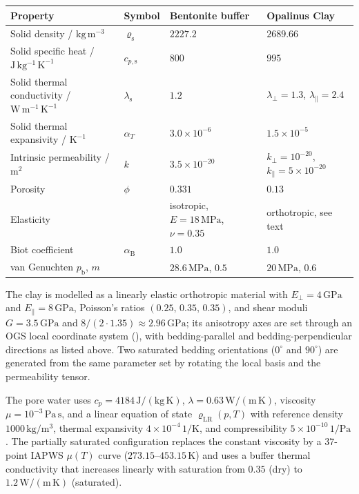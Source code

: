 \documentclass[11pt,a4paper]{tubaf-report}
\newcommand{\MPa}{\,\mathrm{MPa}}
\newcommand{\GPa}{\,\mathrm{GPa}}
\begin{document}
\begin{center}
\footnotesize
\begin{tabular}{@{}llll@{}}
\toprule
Property & Symbol & Bentonite buffer & Opalinus Clay \\
\midrule
Solid density / $\mathrm{kg\,m^{-3}}$ & $\varrho_{\mathrm s}$ & $2227.2$ & $2689.66$ \\
Solid specific heat / $\mathrm{J\,kg^{-1}\,K^{-1}}$ & $c_{p,\mathrm s}$ & $800$ & $995$ \\
Solid thermal conductivity / $\mathrm{W\,m^{-1}\,K^{-1}}$ & $\lambda_{\mathrm s}$ & $1.2$ &
  $\lambda_\perp=1.3$, $\lambda_\parallel=2.4$ \\
Solid thermal expansivity / $\mathrm{K^{-1}}$ & $\alpha_{T}$ & $3.0\times10^{-6}$ & $1.5\times10^{-5}$ \\
Intrinsic permeability / $\mathrm{m^2}$ & $k$ & $3.5\times10^{-20}$ &
  $k_\perp=10^{-20}$, $k_\parallel=5\times10^{-20}$ \\
Porosity & $\phi$ & $0.331$ & $0.13$ \\
Elasticity & & isotropic, $E=18\MPa$, $\nu=0.35$ &
  orthotropic, see text \\
Biot coefficient & $\alpha_{\mathrm B}$ & $1.0$ & $1.0$ \\
van Genuchten $p_{\mathrm b}$, $m$ & & $28.6\MPa$, $0.5$ & $20\MPa$, $0.6$ \\
\bottomrule
\end{tabular}
\end{center}

The clay is modelled as a linearly elastic orthotropic material with
$E_\perp=4\GPa$ and $E_\parallel=8\GPa$, Poisson's ratios
$(0.25,\,0.35,\,0.35)$, and shear moduli
$G=3.5\GPa$ and $8/(2\cdot1.35)\approx2.96\GPa$; its anisotropy
axes are set through an OGS local coordinate system
(), with bedding-parallel and
bedding-perpendicular directions as listed above. Two saturated bedding
orientations ($0^\circ$ and $90^\circ$) are generated from the same
parameter set by rotating the local basis and the permeability tensor.

The pore water uses $c_p=4184\,\mathrm{J/(kg\,K)}$,
$\lambda=0.63\,\mathrm{W/(m\,K)}$, viscosity
$\mu=10^{-3}\,\mathrm{Pa\,s}$, and a linear equation of state
$\varrho_{\mathrm{LR}}(p,T)$ with reference density
$1000\,\mathrm{kg/m^3}$, thermal expansivity $4\times10^{-4}\,\mathrm{1/K}$,
and compressibility $5\times10^{-10}\,\mathrm{1/Pa}$. The partially
saturated configuration replaces the constant viscosity by a 37-point IAPWS
$\mu(T)$ curve ($273.15$--$453.15\,\mathrm K$) and uses a buffer thermal
conductivity that increases linearly with saturation from
$0.35$ (dry) to $1.2\,\mathrm{W/(m\,K)}$ (saturated).
\end{document}
